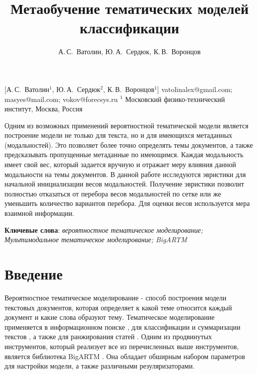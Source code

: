 \documentclass[12pt, twoside]{article}
\begin{document}
\title
    [Метаобучение тематических моделей классификации] %
    {Метаобучение тематических моделей классификации}
\author
    [А.\,С.~Ватолин] %
    {А.\,С.~Ватолин, Ю.\,А.~Сердюк, К.\,В.~Воронцов} %
    [А.\,С.~Ватолин$^1$, Ю.\,А.~Сердюк$^2$, К.\,В.~Воронцов$^1$] %
\email
    {vatolinalex@gmail.com; masyes@mail.com;  vokov@forecsys.ru}
\organization
    {$^1$ Московский физико-технический институт, Москва, Россия}
\abstract
    {Одним из возможных применений вероятностной тематической модели является построение модели не только для текста, но и для имеющихся метаданных (модальностей). Это позволяет более точно определять темы документов, а также предсказывать пропущенные метаданные по имеющимся. Каждая модальность имеет свой вес, который задается вручную и отражает меру влияния данной модальности на темы документов.
    В данной работе исследуются эвристики для начальной инициализации весов модальностей. Получение эвристики позволит
    полностью отказаться от перебора весов модальностей по сетке или же уменьшить количество вариантов перебора.
    Для оценки весов используется мера взаимной информации.
	
	\bigskip
	\noindent
	\textbf{Ключевые слова}: \emph {вероятностное тематическое моделирование; Мультимодальное тематическое моделирование; 
	BigARTM}
}


\maketitle
\linenumbers

\section{Введение}
Вероятностное тематическое моделирование - способ построения модели текстовых документов, которая определяет к какой теме
относится каждый документ и какие слова образуют тему. Тематическое моделирование применяется в информационном поиске
\cite{tm_recomedation}, для классификации \cite{rubin2012statistical} и суммаризации текстов \cite{artm_summarization}, 
а также для ранжирования статей \cite{ranktopic}. Одним из продвинутых инструментов, который реализует все из перечисленных выше инструментов, является библиотека BigARTM \cite{vorontsov/artm_book}. Она обладает обширным набором параметров для настройки модели, а также различными резуляризаторами.
\end{document}
